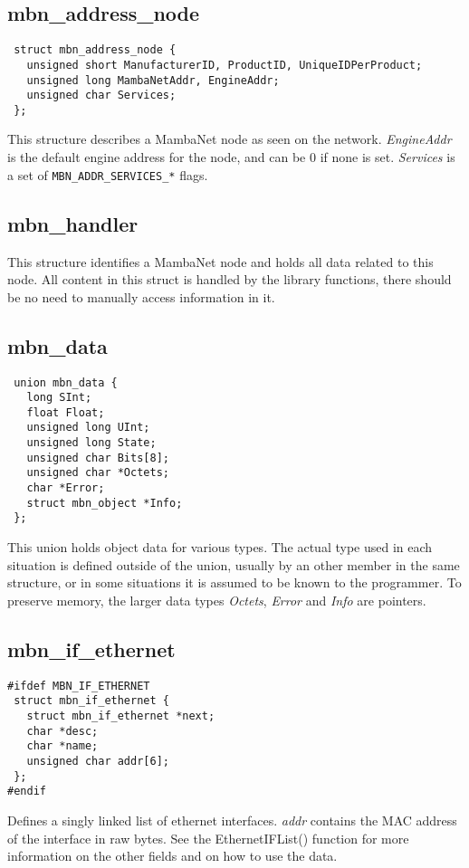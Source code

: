 \documentclass[a4paper]{report}
\begin{document}
\subsection{mbn\_address\_node}
\begin{verbatim}
 struct mbn_address_node {
   unsigned short ManufacturerID, ProductID, UniqueIDPerProduct;
   unsigned long MambaNetAddr, EngineAddr;
   unsigned char Services;
 };
\end{verbatim}
This structure describes a MambaNet node as seen on the network. \textit{EngineAddr} is the default engine address for the node, and can be 0 if none is set. \textit{Services} is a set of \verb|MBN_ADDR_SERVICES_*| flags.


\subsection{mbn\_handler}
This structure identifies a MambaNet node and holds all data related to this node. All content in this struct is handled by the library functions, there should be no need to manually access information in it.


\subsection{mbn\_data}
\begin{verbatim}
 union mbn_data {
   long SInt;
   float Float;
   unsigned long UInt;
   unsigned long State;
   unsigned char Bits[8];
   unsigned char *Octets;
   char *Error;
   struct mbn_object *Info;
 };
\end{verbatim}
This union holds object data for various types. The actual type used in each situation is defined outside of the union, usually by an other member in the same structure, or in some situations it is assumed to be known to the programmer. To preserve memory, the larger data types \textit{Octets}, \textit{Error} and \textit{Info} are pointers.


\subsection{mbn\_if\_ethernet}
\begin{verbatim}
#ifdef MBN_IF_ETHERNET
 struct mbn_if_ethernet {
   struct mbn_if_ethernet *next;
   char *desc;
   char *name;
   unsigned char addr[6];
 };
#endif
\end{verbatim}
Defines a singly linked list of ethernet interfaces. \textit{addr} contains the MAC address of the interface in raw bytes. See the EthernetIFList() function for more information on the other fields and on how to use the data.
\end{document}
